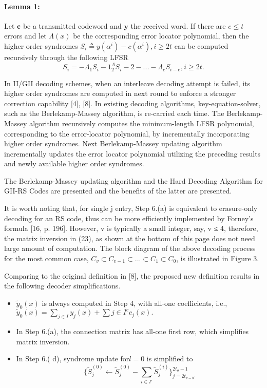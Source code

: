 \documentclass[fontsize=12pt]{article}
\begin{document}
\paragraph{Lemma 1:} Let $\mathbf{c}$ be a transmitted codeword and $\mathbf{y}$ the
received word. If there are $e \leq t$ errors and let $\Lambda(x)$ be
the corresponding error locator polynomial, then the higher
order syndromes $S_i
\triangleq
y(\alpha^i )−c(\alpha^i ), i \geq 2t$ can be computed
recursively through the following LFSR
\begin{equation}
S_i = -\Lambda_1S_i−1 ^\Lambda_2S_i−2 - . . . - \Lambda_e S_{i−e} , i ≥ 2t.
\end{equation}

In II/GII decoding schemes, when an interleave
decoding attempt is failed, its higher order syndromes
are computed in next round to enforce a stronger correction
capability [4], [8]. In existing decoding algorithms,
key-equation-solver, such as the Berlekamp-Massey
algorithm, is re-carried each time. The Berlekamp-Massey
algorithm recursively computes the minimum-length LFSR
polynomial, corresponding to the error-locator polynomial,
by incrementally incorporating higher order syndromes. Next
Berlekamp-Massey updating algorithm incrementally updates
the error locator polynomial utilizing the preceding results
and newly available higher order syndromes.

The Berlekamp-Massey updating algorithm and the Hard Decoding Algorithm for GII-RS Codes are presented and the benefits of the latter are presented.

It is worth noting that, for single j entry, Step 6.(a) is
equivalent to erasure-only decoding for an RS code, thus
can be more efficiently implemented by Forney’s formula
[16, p. 196]. However, v is typically a small integer, say, v ≤ 4,
therefore, the matrix inversion in (23), as shown at the bottom
of this page does not need large amount of computation. The
block diagram of the above decoding process for the most
common case, $C_v \subset C_{v−1} \subset . . . \subset C_1 \subset C_0$, is illustrated in Figure 3.

Comparing to the original definition in [8], the proposed
new definition results in the following decoder simplifications.
\begin{itemize}
\item $\widetilde{y}_0(x)$ is always computed in Step 4, with all-one
coefficients, i.e., $\widetilde{y}_0(x)
=\sum_{
j\in I} y_j (x) +
\sum{
j\in I^c }c _j (x).$ 
\item In Step 6.(a), the connection matrix has all-one first row,
which simplifies matrix inversion.
\item In Step 6.(
d), syndrome
update for$ l = 0$ is simplified to
$$ \Big\{\widetilde{S}_j^{(0)} \leftarrow \widetilde{S}_j^{(0)}  -\sum_{i\in I'} \widetilde{S}_j^{(i)} \Big\}_{j=2t_{v-b'}}^{2t_o-1}$$
\end{itemize}
 
\end{document}
